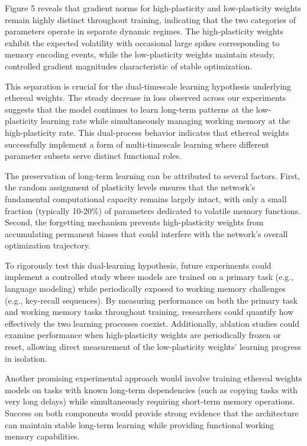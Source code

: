 \documentclass{article} %
\begin{document}
Figure 5 reveals that gradient norms for high-plasticity and low-plasticity weights remain highly distinct throughout training, indicating that the two categories of parameters operate in separate dynamic regimes. The high-plasticity weights exhibit the expected volatility with occasional large spikes corresponding to memory encoding events, while the low-plasticity weights maintain steady, controlled gradient magnitudes characteristic of stable optimization.

This separation is crucial for the dual-timescale learning hypothesis underlying ethereal weights. The steady decrease in loss observed across our experiments suggests that the model continues to learn long-term patterns at the low-plasticity learning rate while simultaneously managing working memory at the high-plasticity rate. This dual-process behavior indicates that ethereal weights successfully implement a form of multi-timescale learning where different parameter subsets serve distinct functional roles.

The preservation of long-term learning can be attributed to several factors. First, the random assignment of plasticity levels ensures that the network's fundamental computational capacity remains largely intact, with only a small fraction (typically 10-20\%) of parameters dedicated to volatile memory functions. Second, the forgetting mechanism prevents high-plasticity weights from accumulating permanent biases that could interfere with the network's overall optimization trajectory.

To rigorously test this dual-learning hypothesis, future experiments could implement a controlled study where models are trained on a primary task (e.g., language modeling) while periodically exposed to working memory challenges (e.g., key-recall sequences). By measuring performance on both the primary task and working memory tasks throughout training, researchers could quantify how effectively the two learning processes coexist. Additionally, ablation studies could examine performance when high-plasticity weights are periodically frozen or reset, allowing direct measurement of the low-plasticity weights' learning progress in isolation.

Another promising experimental approach would involve training ethereal weights models on tasks with known long-term dependencies (such as copying tasks with very long delays) while simultaneously requiring short-term memory operations. Success on both components would provide strong evidence that the architecture can maintain stable long-term learning while providing functional working memory capabilities.
\end{document}
